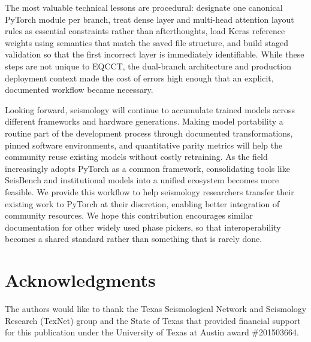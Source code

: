 The most valuable technical lessons are procedural: designate one canonical PyTorch module per branch, treat dense layer and multi-head attention layout rules as essential constraints rather than afterthoughts, load Keras reference weights using semantics that match the saved file structure, and build staged validation so that the first incorrect layer is immediately identifiable. While these steps are not unique to EQCCT, the dual-branch architecture and production deployment context made the cost of errors high enough that an explicit, documented workflow became necessary.

Looking forward, seismology will continue to accumulate trained models across different frameworks and hardware generations. Making model portability a routine part of the development process through documented transformations, pinned software environments, and quantitative parity metrics will help the community reuse existing models without costly retraining. As the field increasingly adopts PyTorch as a common framework, consolidating tools like SeisBench and institutional models into a unified ecosystem becomes more feasible. We provide this workflow to help seismology researchers transfer their existing work to PyTorch at their discretion, enabling better integration of community resources. We hope this contribution encourages similar documentation for other widely used phase pickers, so that interoperability becomes a shared standard rather than something that is rarely done.

\section*{Acknowledgments}

The authors would like to thank the Texas Seismological Network and Seismology Research (TexNet) group and the State of Texas that provided financial support for this publication under the University of Texas at Austin award \#201503664.


